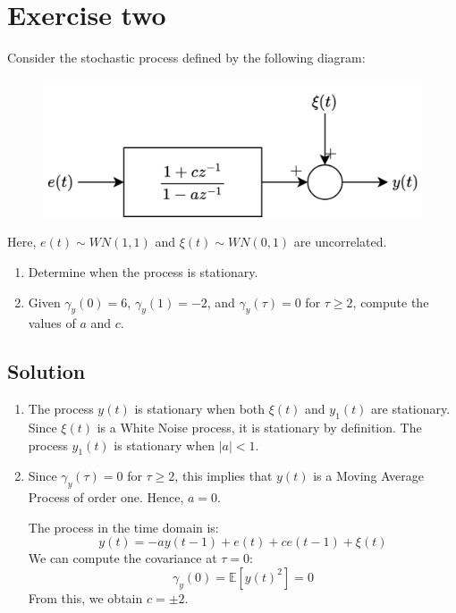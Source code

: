 \section{Exercise two}

Consider the stochastic process defined by the following diagram:
\begin{figure}[H]
    \centering
    \includegraphics[width=0.5\linewidth]{images/block1.png}
\end{figure}
Here, $e(t) \sim WN(1,1)$ and $\xi(t) \sim WN(0,1)$ are uncorrelated.
\begin{enumerate}
    \item Determine when the process is stationary.
    \item Given $\gamma_y(0)=6$, $\gamma_y(1)=-2$, and $\gamma_y(\tau)=0$ for $\tau \geq 2$, compute the values of $a$ and $c$.
\end{enumerate}

\subsection*{Solution}
\begin{enumerate}
    \item The process $y(t)$ is stationary when both $\xi(t)$ and $y_1(t)$ are stationary.
        Since $\xi(t)$ is a  White Noise process, it is stationary by definition.
        The process $y_1(t)$ is stationary when $\left\lvert a \right\rvert<1$.
    \item Since $\gamma_y(\tau)=0$ for $\tau \geq 2$, this implies that $y(t)$ is a Moving Average Process of order one.
        Hence, $a=0$.

        The process in the time domain is: 
        \[y(t)=-ay(t-1)+e(t)+ce(t-1)+\xi(t)\]
        We can compute the covariance at $\tau=0$:
        \[\gamma_y(0)=\mathbb{E}\left[ {y(t)}^2 \right]=0\]
        From this, we obtain $c=\pm 2$. 
\end{enumerate}